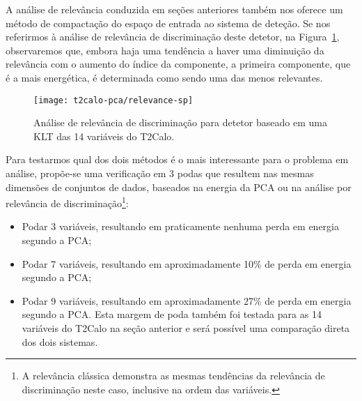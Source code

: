 A análise de relevância conduzida em seções anteriores também nos oferece um
método de compactação do espaço de entrada ao sistema de deteção. Se nos
referirmos à análise de relevância de discriminação deste detetor, na
Figura~\ref{fig:pca-relevance-sp}, observaremos que, embora haja uma tendência
a haver uma diminuição da relevância com o aumento do índice da componente, a
primeira componente, que é a mais energética, é determinada como sendo uma das
menos relevantes.

\begin{figure}
\begin{center}
\texttt{[image: t2calo-pca/relevance-sp]}
\end{center}
\caption{Análise de relevância de discriminação para detetor baseado em uma KLT
das 14 variáveis do T2Calo.}
\label{fig:pca-relevance-sp}
\end{figure}

Para testarmos qual dos dois métodos é o mais interessante para o problema em
análise, propõe-se uma verificação em 3 podas que resultem nas mesmas
dimensões de conjuntos de dados, baseados na energia da PCA ou na análise por
relevância de discriminação\footnote{A relevância clássica demonstra as mesmas
tendências da relevância de discriminação neste caso, inclusive na ordem das
variáveis.}:

\begin{itemize}
\item Podar 3 variáveis, resultando em praticamente nenhuma perda em energia
segundo a PCA;
\item Podar 7 variáveis, resultando em aproximadamente 10\% de perda em energia
segundo a PCA;
\item Podar 9 variáveis, resultando em aproximadamente 27\% de perda em
energia segundo a PCA. Esta margem de poda também foi testada para as 14
variáveis do T2Calo na seção anterior e será possível uma comparação direta
dos dois sistemas.
\end{itemize}

